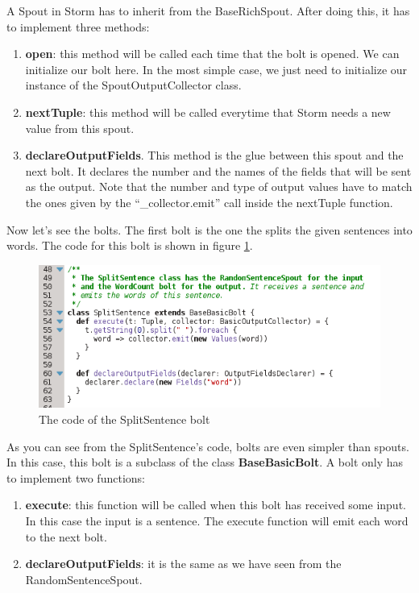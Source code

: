 A Spout in Storm has to inherit from the BaseRichSpout. After doing this, it
has to implement three methods:

\begin{enumerate}
  \itemsep0em
  \item {\bf open}: this method will be called each time that the bolt is
opened. We can initialize our bolt here. In the most simple case, we just need
to initialize our instance of the SpoutOutputCollector class.
  \item {\bf nextTuple}: this method will be called everytime that Storm needs
a new value from this spout.
  \item {\bf declareOutputFields}. This method is the glue between this spout
and the next bolt. It declares the number and the names of the fields that will
be sent as the output. Note that the number and type of output values have to
match the ones given by the ``\_collector.emit'' call inside the nextTuple
function.
\end{enumerate}

Now let's see the bolts. The first bolt is the one the splits the given
sentences into words. The code for this bolt is shown in figure
\ref{fig:splitsentence}.

\begin{figure}
  \centering
  \includegraphics[scale=0.8]{images/splitsentence.png}
  \caption{The code of the SplitSentence bolt}\label{fig:splitsentence}
\end{figure}

As you can see from the SplitSentence's code, bolts are even simpler than
spouts. In this case, this bolt is a subclass of the class {\bf BaseBasicBolt}.
A bolt only has to implement two functions:

\begin{enumerate}
  \itemsep0em
  \item {\bf execute}: this function will be called when this bolt has received
some input. In this case the input is a sentence. The execute function will
emit each word to the next bolt.
  \item {\bf declareOutputFields}: it is the same as we have seen from the
RandomSentenceSpout.
\end{enumerate}

